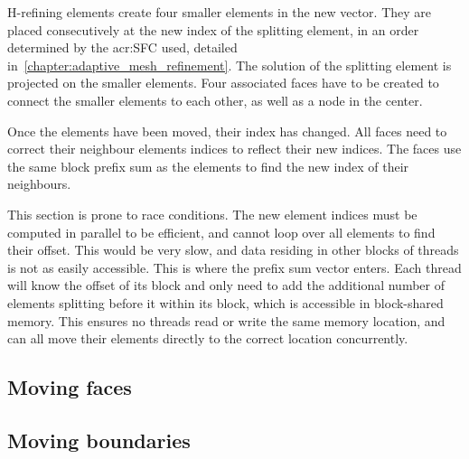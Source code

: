H-refining elements create four smaller elements in the new vector. They are placed consecutively at
the new index of the splitting element, in an order determined by the \acrfull{acr:SFC} used,
detailed in~\ref{chapter:adaptive_mesh_refinement}. The solution of the splitting element is
projected on the smaller elements. Four associated faces have to be created to connect the smaller
elements to each other, as well as a node in the center. 

Once the elements have been moved, their index has changed. All faces need to correct their
neighbour elements indices to reflect their new indices. The faces use the same block prefix sum as
the elements to find the new index of their neighbours.

This section is prone to race conditions. The new element indices must be computed in parallel to be
efficient, and cannot loop over all elements to find their offset. This would be very slow, and data
residing in other blocks of threads is not as easily accessible. This is where the prefix sum vector
enters. Each thread will know the offset of its block and only need to add the additional number of
elements splitting before it within its block, which is accessible in block-shared memory. This
ensures no threads read or write the same memory location, and can all move their elements directly
to the correct location concurrently.

\subsection{Moving faces}\label{subsection:adaptive_mesh_refinement:implementation:moving_faces}


\subsection{Moving boundaries}\label{subsection:adaptive_mesh_refinement:implementation:moving_boundaries}

